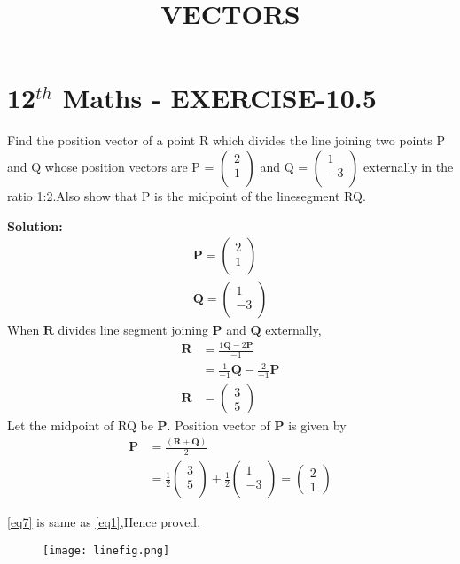 \documentclass[10pt]{article}
\newcommand{\solution}{\noindent \textbf{Solution: }}
\newcommand{\myvec}[1]{\ensuremath{\begin{pmatrix}#1\end{pmatrix}}}
\let\vec\mathbf{}
\begin{document}
\begin{center}
\title{\textbf{VECTORS}}
\date{\vspace{-5ex}} %
\maketitle
\end{center}

\section*{12$^{th}$ Maths - EXERCISE-10.5}

Find the position vector of a point R which divides the line joining two points  P and Q whose position vectors are P = $\myvec{2\\ 1 \\}$ and Q = $\myvec{ 1\\-3\\ }$  externally in the ratio 1:2.Also show that P is the midpoint of the linesegment RQ.

\solution
\begin{align}
\vec{P} = \myvec{ 2\\1\\} 
 \label{eq1} \\
 \vec{Q} = \myvec{ 1\\-3\\}
\end{align}
 When $\vec{R}$ divides line segment joining $\vec{P}$ and $\vec{Q}$ externally,
\begin{align}
\vec{R} &= \frac{1\vec{Q} -2\vec{P}}{-1} \\
 &= \frac{1}{-1} \vec{Q} -\frac{2}{-1} \vec{P}\\
\vec{R} &= \myvec{3\\5}
\end{align}
Let the midpoint of RQ  be $\vec{P}$.
Position vector of $\vec{P}$ is given by
\begin{align}
 \vec{P} &= \frac{ (\vec{R} + \vec{Q})}{2}\\
&=\frac{1}{2}\myvec{3\\5\\} +  \frac{1}{2}\myvec{1\\-3\\} =\myvec{2\\1} 
 \label{eq7}
\end{align}

\eqref{eq7} is same as \eqref{eq1},Hence proved.

\begin{figure}[!ht]
	\centering
	\texttt{[image: linefig.png]}
	\caption{}
\end{figure}
\end{document}
